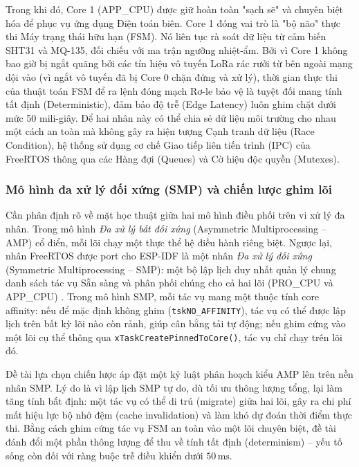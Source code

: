 Trong khi đó, Core 1 (APP\_CPU) được giữ hoàn toàn "sạch sẽ" và chuyên biệt hóa để phục vụ ứng dụng Điện toán biên. Core 1 đóng vai trò là "bộ não" thực thi Máy trạng thái hữu hạn (FSM). Nó liên tục rà soát dữ liệu từ cảm biến SHT31 và MQ-135, đối chiếu với ma trận ngưỡng nhiệt-ẩm. Bởi vì Core 1 không bao giờ bị ngắt quãng bởi các tín hiệu vô tuyến LoRa rác rưởi từ bên ngoài mạng dội vào (vì ngắt vô tuyến đã bị Core 0 chặn đứng và xử lý), thời gian thực thi của thuật toán FSM để ra lệnh đóng mạch Rơ-le bảo vệ là tuyệt đối mang tính tất định (Deterministic), đảm bảo độ trễ (Edge Latency) luôn ghim chặt dưới mức 50 mili-giây. Để hai nhân này có thể chia sẻ dữ liệu môi trường cho nhau một cách an toàn mà không gây ra hiện tượng Cạnh tranh dữ liệu (Race Condition), hệ thống sử dụng cơ chế Giao tiếp liên tiến trình (IPC) của FreeRTOS thông qua các Hàng đợi (Queues) và Cờ hiệu độc quyền (Mutexes).

\subsubsection{Mô hình đa xử lý đối xứng (SMP) và chiến lược ghim lõi}
Cần phân định rõ về mặt học thuật giữa hai mô hình điều phối trên vi xử lý đa nhân. Trong mô hình \textit{Đa xử lý bất đối xứng} (Asymmetric Multiprocessing -- AMP) cổ điển, mỗi lõi chạy một thực thể hệ điều hành riêng biệt. Ngược lại, nhân FreeRTOS được port cho ESP-IDF là một nhân \textit{Đa xử lý đối xứng} (Symmetric Multiprocessing -- SMP): một bộ lập lịch duy nhất quản lý chung danh sách tác vụ Sẵn sàng và phân phối chúng cho cả hai lõi (PRO\_CPU và APP\_CPU) \cite{espressif_freertos_idf}. Trong mô hình SMP, mỗi tác vụ mang một thuộc tính core affinity: nếu để mặc định không ghim (\texttt{tskNO\_AFFINITY}), tác vụ có thể được lập lịch trên bất kỳ lõi nào còn rảnh, giúp cân bằng tải tự động; nếu ghim cứng vào một lõi cụ thể thông qua \texttt{xTaskCreatePinnedToCore()}, tác vụ chỉ chạy trên lõi đó.

Đề tài lựa chọn chiến lược áp đặt một kỷ luật phân hoạch kiểu AMP lên trên nền nhân SMP. Lý do là vì lập lịch SMP tự do, dù tối ưu thông lượng tổng, lại làm tăng tính bất định: một tác vụ có thể di trú (migrate) giữa hai lõi, gây ra chi phí mất hiệu lực bộ nhớ đệm (cache invalidation) và làm khó dự đoán thời điểm thực thi. Bằng cách ghim cứng tác vụ FSM an toàn vào một lõi chuyên biệt, đề tài đánh đổi một phần thông lượng để thu về tính tất định (determinism) -- yếu tố sống còn đối với ràng buộc trễ điều khiển dưới $50\,\text{ms}$.

